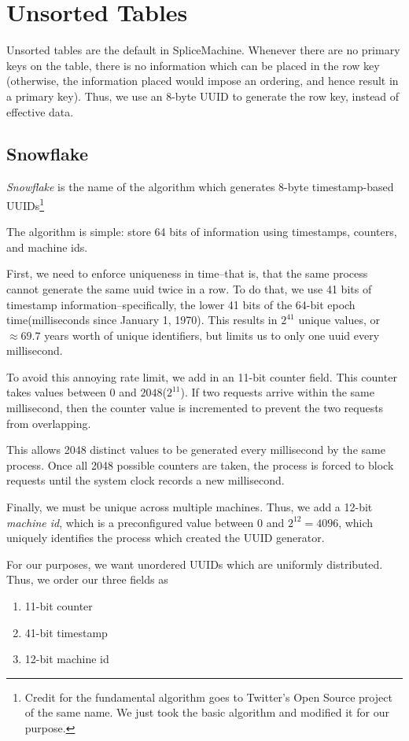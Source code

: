 \section{Unsorted Tables}
Unsorted tables are the default in SpliceMachine. Whenever there are no primary keys on the table, there is no information which can be placed in the row key (otherwise, the information placed would impose an ordering, and hence result in a primary key). Thus, we use an 8-byte UUID to generate the row key, instead of effective data.
\subsection{Snowflake}
\emph{Snowflake} is the name of the algorithm which generates 8-byte timestamp-based UUIDs\footnote{Credit for the fundamental algorithm goes to Twitter's Open Source project of the same name. We just took the basic algorithm and modified it for our purpose.}

The algorithm is simple: store 64 bits of information using timestamps, counters, and machine ids.

First, we need to enforce uniqueness in time--that is, that the same process cannot generate the same uuid twice in a row. To do that, we use 41 bits of timestamp information--specifically, the lower 41 bits of the 64-bit epoch time(milliseconds since January 1, 1970). This results in $2^{41}$ unique values, or $\approx 69.7$ years worth of unique identifiers, but limits us to only one uuid every millisecond. 

To avoid this annoying rate limit, we add in an 11-bit counter field. This counter takes values between $0$ and $2048$($2^{11}$). If two requests arrive within the same millisecond, then the counter value is incremented to prevent the two requests from overlapping. 

This allows 2048 distinct values to be generated every millisecond by the same process. Once all 2048 possible counters are taken, the process is forced to block requests until the system clock records a new millisecond. 

Finally, we must be unique across multiple machines. Thus, we add a 12-bit \emph{machine id}, which is a preconfigured value between 0 and $2^{12} = 4096$, which uniquely identifies the process which created the UUID generator.

For our purposes, we want unordered UUIDs which are uniformly distributed. Thus, we order our three fields as
\begin{enumerate}
\item 11-bit counter
\item 41-bit timestamp
\item 12-bit machine id
\end{enumerate}

